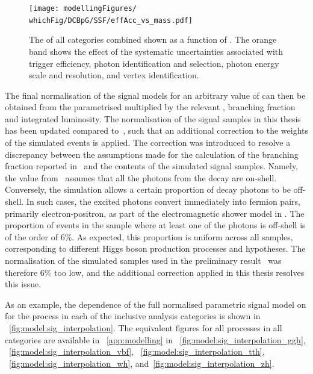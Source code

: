 \begin{figure}[ht!]
\centering
\texttt{[image: modellingFigures/\\whichFig/DCBpG/SSF/effAcc\_vs\_mass.pdf]} 
\caption{The \effxacc of all categories combined shown as a function of \mH. The orange band shows the effect of the systematic uncertainties associated with trigger efficiency, photon identification and selection, photon energy scale and resolution, and vertex identification.}

\label{fig:model:sig_effxacc}
\end{figure}

The final normalisation of the signal models for an arbitrary value of \mH can then be obtained from the parametrised \effxacc multiplied by the relevant \crosssection, branching fraction and integrated luminosity.
The normalisation of the signal samples in this thesis has been updated compared to~\cite{CMS-PAS-HIG-16-020}, such that an additional correction to the weights of the simulated events is applied. The correction was introduced to resolve a discrepancy between the assumptions made for the calculation of the \SM \Hgg branching fraction reported in~\cite{LHCHXSWGYR4} and the contents of the simulated signal samples. Namely, the value from~\cite{LHCHXSWGYR4} assumes that all the photons from the \Hgg decay are on-shell. Conversely, the simulation allows a certain proportion of \Hgg decay photons to be off-shell. In such cases, the excited photons convert immediately into fermion pairs, primarily electron-positron, as part of the electromagnetic shower model in \Pythia. The proportion of events in the sample where at least one of the photons is off-shell is of the order of 6\%. As expected, this proportion is uniform across all samples, corresponding to different Higgs boson production processes and \mH hypotheses. The normalisation of the simulated samples used in the preliminary result~\cite{CMS-PAS-HIG-16-020} was therefore 6\% too low, and the additional correction applied in this thesis resolves this issue.  

As an example, the dependence of the full normalised parametric signal model on \mH for the \ggH process in each of the inclusive analysis categories is shown in \Fig~\ref{fig:model:sig_interpolation}. The equivalent figures for all processes in all categories are available in \App~\ref{app:modelling} in \Fig\s~\ref{fig:model:sig_interpolation_ggh}, ~\ref{fig:model:sig_interpolation_vbf}, ~\ref{fig:model:sig_interpolation_tth}, ~\ref{fig:model:sig_interpolation_wh}, and~\ref{fig:model:sig_interpolation_zh}.

